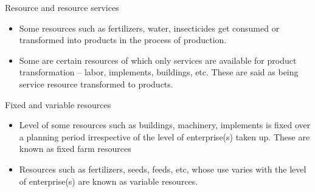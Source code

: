 \documentclass[12pt,ignorenonframetext,aspectratio=169]{beamer}
\providecommand{\tightlist}{%
  \setlength{\itemsep}{0pt}\setlength{\parskip}{0pt}}
\begin{document}
\begin{frame}{}
\protect\hypertarget{section-4}{}

\begin{block}{Resource and resource services}

\begin{itemize}
\tightlist
\item
  Some resources such as fertilizers, water, insecticides get consumed
  or transformed into products in the process of production.
\item
  Some are certain resources of which only services are available for
  product transformation -- labor, implements, buildings, etc. These are
  said as being service resource transformed to products.
\end{itemize}

\end{block}

\begin{block}{Fixed and variable resources}

\begin{itemize}
\tightlist
\item
  Level of some resources such as buildings, machinery, implements is
  fixed over a planning period irrespective of the level of
  enterprise(s) taken up. These are known as fixed farm resources
\item
  Resources such as fertilizers, seeds, feeds, etc, whose use varies
  with the level of enterprise(s) are known as variable resources.
\end{itemize}

\end{block}

\end{frame}
\end{document}
